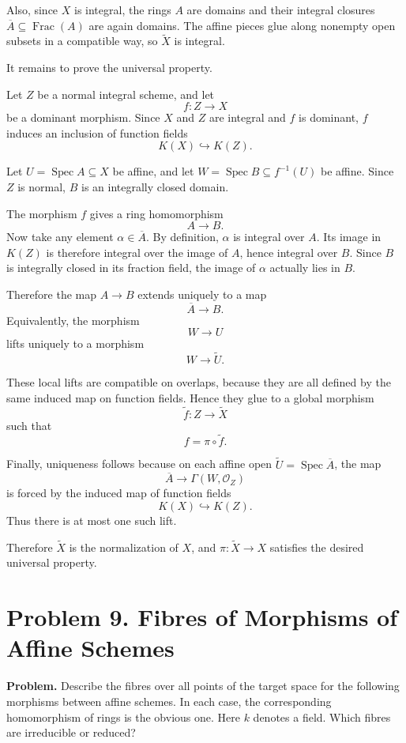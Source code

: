 \documentclass[12pt,a4paper]{article}
\theoremstyle{notespace}
\begin{document}
Also, since \(X\) is integral, the rings \(A\) are domains and their
integral closures \(\overline{A}\subseteq \operatorname{Frac}(A)\) are
again domains. The affine pieces glue along nonempty open subsets in a
compatible way, so \(\widetilde{X}\) is integral.

It remains to prove the universal property.

Let \(Z\) be a normal integral scheme, and let
\[
f:Z\longrightarrow X
\]
be a dominant morphism. Since \(X\) and \(Z\) are integral and \(f\) is
dominant, \(f\) induces an inclusion of function fields
\[
K(X)\hookrightarrow K(Z).
\]

Let \(U=\operatorname{Spec}A\subseteq X\) be affine, and let
\(W=\operatorname{Spec}B\subseteq f^{-1}(U)\) be affine. Since \(Z\) is
normal, \(B\) is an integrally closed domain.

The morphism \(f\) gives a ring homomorphism
\[
A\longrightarrow B.
\]
Now take any element \(\alpha\in \overline{A}\). By definition,
\(\alpha\) is integral over \(A\). Its image in \(K(Z)\) is therefore
integral over the image of \(A\), hence integral over \(B\). Since \(B\)
is integrally closed in its fraction field, the image of \(\alpha\)
actually lies in \(B\).

Therefore the map \(A\to B\) extends uniquely to a map
\[
\overline{A}\longrightarrow B.
\]
Equivalently, the morphism
\[
W\longrightarrow U
\]
lifts uniquely to a morphism
\[
W\longrightarrow \widetilde{U}.
\]

These local lifts are compatible on overlaps, because they are all
defined by the same induced map on function fields. Hence they glue to a
global morphism
\[
\widetilde{f}:Z\longrightarrow \widetilde{X}
\]
such that
\[
f=\pi\circ \widetilde{f}.
\]

Finally, uniqueness follows because on each affine open
\(\widetilde{U}=\operatorname{Spec}\overline{A}\), the map
\[
\overline{A}\longrightarrow \Gamma(W,\mathcal{O}_Z)
\]
is forced by the induced map of function fields
\[
K(X)\hookrightarrow K(Z).
\]
Thus there is at most one such lift.

Therefore \(\widetilde{X}\) is the normalization of \(X\), and
\(\pi:\widetilde{X}\to X\) satisfies the desired universal property.

\section{Problem 9. Fibres of Morphisms of Affine Schemes}

\textbf{Problem.}
Describe the fibres over all points of the target space for the following
morphisms between affine schemes. In each case, the corresponding
homomorphism of rings is the obvious one. Here \(k\) denotes a field.
Which fibres are irreducible or reduced?
\end{document}
